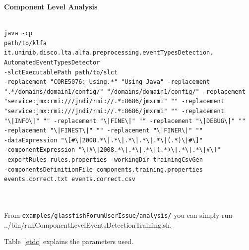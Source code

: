 \textbf{Component Level Analysis}



\begin{verbatim}

java -cp
path/to/klfa
it.unimib.disco.lta.alfa.preprocessing.eventTypesDetection.
AutomatedEventTypesDetector
-slctExecutablePath path/to/slct
-replacement "CORE5076: Using.*" "Using Java" -replacement
".*/domains/domain1/config/" "/domains/domain1/config/" -replacement
"service:jmx:rmi:///jndi/rmi://.*:8686/jmxrmi" "" -replacement
"service:jmx:rmi:///jndi/rmi://.*:8686/jmxrmi" "" -replacement
"\|INFO\|" "" -replacement "\|FINE\|" "" -replacement "\|DEBUG\|" ""
-replacement "\|FINEST\|" "" -replacement "\|FINER\|" ""
-dataExpression "\[#\|2008.*\|.*\|.*\|.*\|.*\|(.*)\|#\]"
-componentExpression "\[#\|2008.*\|.*\|.*\|(.*)\|.*\|.*\|#\]"
-exportRules rules.properties -workingDir trainingCsvGen
-componentsDefinitionFile components.training.properties
events.correct.txt events.correct.csv



\end{verbatim}

From \texttt{examples/glassfishForumUserIssue/analysis/} you can simply run
../bin/runComponentLevelEventsDetectionTraining.sh.

Table~\ref{etdc} explains the parameters used.


